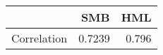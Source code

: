 \begin{tabular}{lrr}
\toprule
{} &     SMB &    HML \\
\midrule
Correlation &  0.7239 &  0.796 \\
\bottomrule
\end{tabular}
